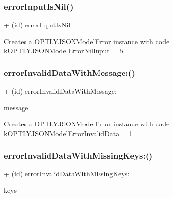 \subsubsection{\texorpdfstring{error\+Input\+Is\+Nil()}{errorInputIsNil()}}
{\footnotesize\ttfamily + (id) error\+Input\+Is\+Nil \begin{DoxyParamCaption}{ }\end{DoxyParamCaption}}

Creates a \mbox{\hyperlink{interface_o_p_t_l_y_j_s_o_n_model_error}{O\+P\+T\+L\+Y\+J\+S\+O\+N\+Model\+Error}} instance with code k\+O\+P\+T\+L\+Y\+J\+S\+O\+N\+Model\+Error\+Nil\+Input = 5 \mbox{\label{interface_o_p_t_l_y_j_s_o_n_model_error_a1da60d544a49a3600e1a6c94acfbe898}} 
\subsubsection{\texorpdfstring{error\+Invalid\+Data\+With\+Message\+:()}{errorInvalidDataWithMessage:()}}
{\footnotesize\ttfamily + (id) error\+Invalid\+Data\+With\+Message\+: \begin{DoxyParamCaption}\item[{(N\+S\+String $\ast$)}]{message }\end{DoxyParamCaption}}

Creates a \mbox{\hyperlink{interface_o_p_t_l_y_j_s_o_n_model_error}{O\+P\+T\+L\+Y\+J\+S\+O\+N\+Model\+Error}} instance with code k\+O\+P\+T\+L\+Y\+J\+S\+O\+N\+Model\+Error\+Invalid\+Data = 1 \mbox{\label{interface_o_p_t_l_y_j_s_o_n_model_error_ad07fbdaf254311345b53418accf891c4}} 
\subsubsection{\texorpdfstring{error\+Invalid\+Data\+With\+Missing\+Keys\+:()}{errorInvalidDataWithMissingKeys:()}}
{\footnotesize\ttfamily + (id) error\+Invalid\+Data\+With\+Missing\+Keys\+: \begin{DoxyParamCaption}\item[{(N\+S\+Set $\ast$)}]{keys }\end{DoxyParamCaption}}

